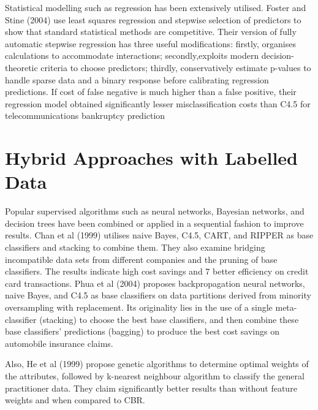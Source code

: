 \par
Statistical modelling such as regression has been extensively utilised.
Foster and Stine (2004) use least squares regression and stepwise selection
of predictors to show that standard statistical methods are competitive.
Their version of fully automatic stepwise regression has three useful
modifications: firstly, organises calculations to accommodate interactions;
secondly,exploits modern decision-theoretic criteria to choose predictors;
thirdly, conservatively estimate p-values to handle sparse data and a binary
response before calibrating regression predictions. If cost of false negative
is much higher than a false positive, their regression model obtained
significantly lesser misclassification costs than C4.5 for telecommunications
bankruptcy prediction

\section{Hybrid Approaches with Labelled Data}
Popular supervised algorithms such as neural networks, Bayesian networks, and
decision trees have been combined or applied in a sequential fashion to
improve results. Chan et al (1999) utilises naive Bayes, C4.5, CART, and
RIPPER as base classifiers and stacking to combine them. They also examine
bridging incompatible data sets from different companies and the pruning of
base classifiers. The results indicate high cost savings and 7 better
efficiency on credit card transactions. Phua et al (2004) proposes
backpropagation neural networks, naive Bayes, and C4.5 as base classifiers on
data partitions derived from minority oversampling with replacement. Its
originality lies in the use of a single meta-classifier (stacking) to choose
the best base classifiers, and then combine these base classifiers’
predictions (bagging) to produce the best cost savings on automobile
insurance claims.

\par
Also, He et al (1999) propose genetic algorithms to determine optimal weights
of the attributes, followed by k-nearest neighbour algorithm to classify the
general practitioner data. They claim significantly better results than
without feature weights and when compared to CBR.

